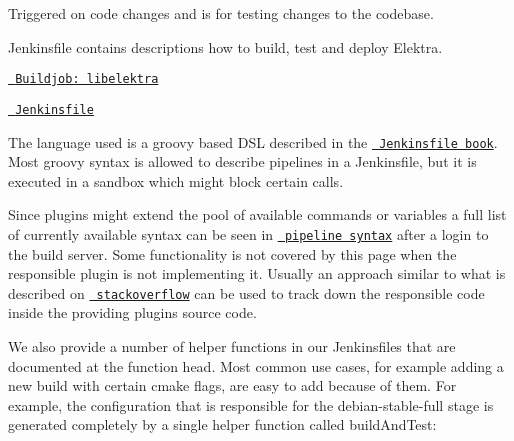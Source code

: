 \begin{DoxyItemize}
\item Triggered on code changes and is for testing changes to the codebase.
\item Jenkinsfile contains descriptions how to build, test and deploy Elektra.
\item \href{https://build.libelektra.org/job/libelektra/}{\texttt{ Buildjob\+: libelektra}}
\item \href{https://master.libelektra.org/scripts/jenkins/Jenkinsfile}{\texttt{ Jenkinsfile}}
\end{DoxyItemize}

The language used is a groovy based D\+SL described in the \href{https://jenkins.io/doc/book/pipeline/jenkinsfile/}{\texttt{ Jenkinsfile book}}. Most groovy syntax is allowed to describe pipelines in a Jenkinsfile, but it is executed in a sandbox which might block certain calls.

Since plugins might extend the pool of available commands or variables a full list of currently available syntax can be seen in \href{https://build.libelektra.org/job/libelektra/pipeline-syntax/}{\texttt{ pipeline syntax}} after a login to the build server. Some functionality is not covered by this page when the responsible plugin is not implementing it. Usually an approach similar to what is described on \href{https://stackoverflow.com/questions/51103359/jenkins-pipeline-return-value-of-build-step}{\texttt{ stackoverflow}} can be used to track down the responsible code inside the providing plugins source code.

We also provide a number of helper functions in our Jenkinsfiles that are documented at the function head. Most common use cases, for example adding a new build with certain cmake flags, are easy to add because of them. For example, the configuration that is responsible for the {\ttfamily debian-\/stable-\/full} stage is generated completely by a single helper function called {\ttfamily build\+And\+Test}\+:


\begin{DoxyCode}{0}
\DoxyCodeLine{  ,}
\DoxyCodeLine{)}
\end{DoxyCode}


